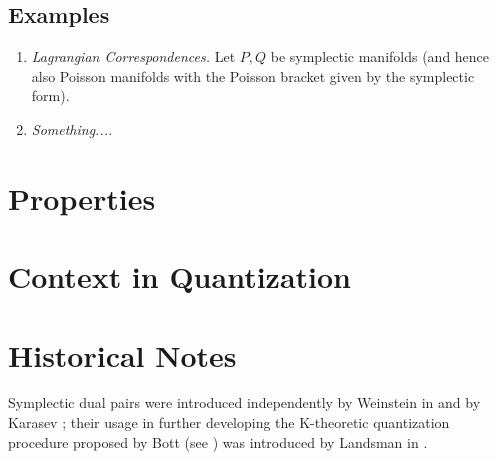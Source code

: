 \documentclass{tufte-handout}
\begin{document}
\subsection{Examples}
\begin{enumerate}
\item \emph{Lagrangian Correspondences.} Let $P,Q$ be symplectic manifolds (and hence also Poisson manifolds with the Poisson bracket given by the symplectic form). %
\item \emph{Something....}
\end{enumerate}



\section{Properties}


\section{Context in Quantization}





\section{Historical Notes}
Symplectic dual pairs were introduced independently by Weinstein in \cite{weinsteindualpairs} and by Karasev \cite{karasev89}; their usage in further developing the K-theoretic quantization procedure proposed by Bott (see \cite{bottquant}) was introduced by Landsman in \cite{landsmankk}. %
\end{document}
